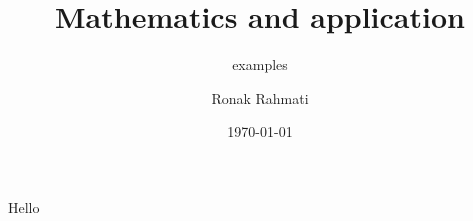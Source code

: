\documentclass{beamer}
\title[Calculus]{Mathematics and application}
\subtitle{examples}
\author{Ronak Rahmati}
\institute{Czech university of life science}
\date{\today}
\begin{document}
\begin{frame}
   \titlepage 
\end{frame}

\begin{frame}
Hello
\end{frame}
\end{document}
